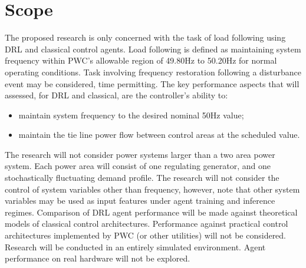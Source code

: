 \section{Scope}
The proposed research is only concerned with the task of load following using DRL and classical control agents. Load following is defined as maintaining system frequency within PWC's allowable region of 49.80$\si{\hertz}$ to 50.20$\si{\hertz}$ for normal operating conditions. Task involving frequency restoration following a disturbance event may be considered, time permitting. The key performance aspects that will assessed, for DRL and classical, are the controller's ability to:
\begin{itemize}
	\item maintain system frequency to the desired nominal 50$\si{\hertz}$ value;
	\item maintain the tie line power flow between control areas at the scheduled value.
\end{itemize}

The research will not consider power systems larger than a two area power system. Each power area will consist of one regulating generator, and one stochastically fluctuating demand profile. The research will not consider the control of system variables other than frequency, however, note that other system variables may be used as input features under agent training and inference regimes. Comparison of DRL agent performance will be made against theoretical models of classical control architectures. Performance against practical control architectures implemented by PWC (or other utilities) will not be considered. Research will be conducted in an entirely simulated environment. Agent performance on real hardware will not be explored.